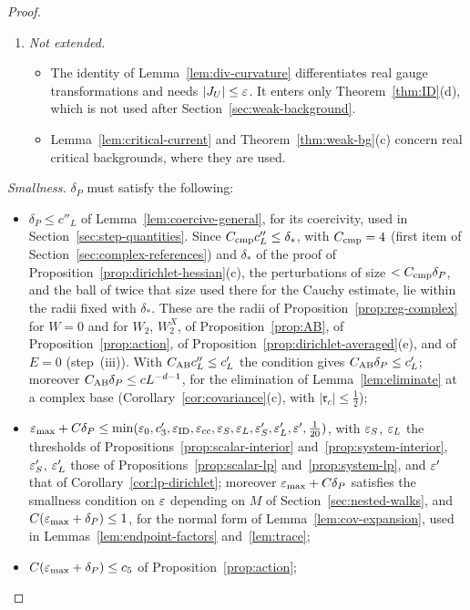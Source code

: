 \begin{proof}
\begin{enumerate}[label=(\roman*)]
\item \emph{Not extended.}
  \begin{itemize}
  \item The identity of Lemma~\ref{lem:div-curvature} differentiates real gauge transformations and needs $|J_U|\le\varepsilon$. It enters only Theorem~\ref{thm:ID}(d), which is not used after Section~\ref{sec:weak-background}.
  \item Lemma~\ref{lem:critical-current} and Theorem~\ref{thm:weak-bg}(c) concern real critical backgrounds, where they are used.
  \end{itemize}
\end{enumerate}
\emph{Smallness.} $\delta_P$ must satisfy the following:
\begin{itemize}
\item $\delta_P\le c''_L$ of Lemma~\ref{lem:coercive-general}, for its coercivity, used in Section~\ref{sec:step-quantities}. Since $C_{\rm cmp}c''_L\le\delta_*$, with $C_{\rm cmp}=4$ (first item of Section~\ref{sec:complex-references}) and $\delta_*$ of the proof of Proposition~\ref{prop:dirichlet-hessian}(c), the perturbations of size $<C_{\rm cmp}\delta_P$, and the ball of twice that size used there for the Cauchy estimate, lie within the radii fixed with $\delta_*$. These are the radii of Proposition~\ref{prop:reg-complex} for $W=0$ and for $W_2$, $W_2^X$, of Proposition~\ref{prop:AB}, of Proposition~\ref{prop:action}, of Proposition~\ref{prop:dirichlet-averaged}(e), and of $E=0$ (step~(iii)). With $C_{\rm AB}c''_L\le c'_L$ the condition gives $C_{\rm AB}\delta_P\le c'_L$; moreover $C_{\rm AB}\delta_P\le cL^{-d-1}$, for the elimination of Lemma~\ref{lem:eliminate} at a complex base (Corollary~\ref{cor:covariance}(c), with $|\mathfrak r_c|\le\frac12$);
\item $\varepsilon_{\max}+C\delta_P\le\min(\varepsilon_0,c'_3,\varepsilon_{\rm ID},\varepsilon_{\rm cc},\varepsilon_S,\varepsilon_L,\varepsilon'_S,\varepsilon'_L,\varepsilon',\frac1{20})$, with $\varepsilon_S$, $\varepsilon_L$ the thresholds of Propositions~\ref{prop:scalar-interior} and~\ref{prop:system-interior}, $\varepsilon'_S$, $\varepsilon'_L$ those of Propositions~\ref{prop:scalar-lp} and~\ref{prop:system-lp}, and $\varepsilon'$ that of Corollary~\ref{cor:lp-dirichlet}; moreover $\varepsilon_{\max}+C\delta_P$ satisfies the smallness condition on $\varepsilon$ depending on $M$ of Section~\ref{sec:nested-walks}, and $C(\varepsilon_{\max}+\delta_P)\le1$, for the normal form of Lemma~\ref{lem:cov-expansion}, used in Lemmas~\ref{lem:endpoint-factors} and~\ref{lem:trace};
\item $C(\varepsilon_{\max}+\delta_P)\le c_5$ of Proposition~\ref{prop:action};

\end{itemize}
\end{proof}
